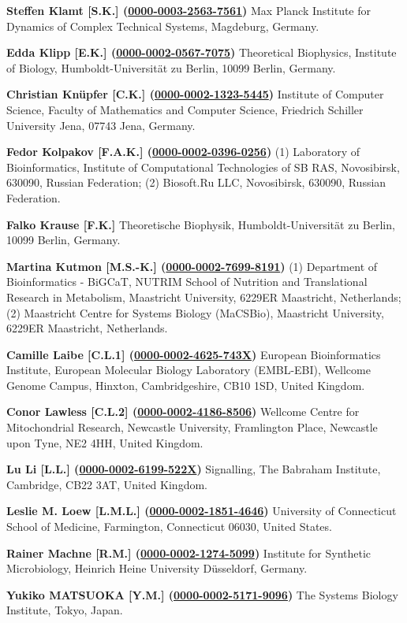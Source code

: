 \documentclass{sbml-paper}
\newcommand{\orcid}[1]{\href{https://orcid.org/#1}{#1}}
\begin{document}
\textbf{Steffen Klamt [S.K.] (\orcid{0000-0003-2563-7561})} Max Planck Institute for Dynamics of Complex Technical Systems, Magdeburg, Germany.

\textbf{Edda Klipp [E.K.] (\orcid{0000-0002-0567-7075})} Theoretical Biophysics, Institute of Biology, Humboldt-Universität zu Berlin, 10099 Berlin, Germany.

\textbf{Christian Knüpfer [C.K.] (\orcid{0000-0002-1323-5445})} Institute of Computer Science, Faculty of Mathematics and Computer Science, Friedrich Schiller University Jena, 07743 Jena, Germany.

\textbf{Fedor Kolpakov [F.A.K.] (\orcid{0000-0002-0396-0256})} (1) Laboratory of Bioinformatics, Institute of Computational Technologies of SB RAS, Novosibirsk, 630090, Russian Federation; (2) Biosoft.Ru LLC, Novosibirsk, 630090, Russian Federation.

\textbf{Falko Krause [F.K.]} Theoretische Biophysik, Humboldt-Universität zu Berlin, 10099 Berlin, Germany.

\textbf{Martina Kutmon [M.S.-K.] (\orcid{0000-0002-7699-8191})} (1) Department of Bioinformatics - BiGCaT, NUTRIM School of Nutrition and Translational Research in Metabolism, Maastricht University, 6229ER Maastricht, Netherlands; (2) Maastricht Centre for Systems Biology (MaCSBio), Maastricht University, 6229ER Maastricht, Netherlands.

\textbf{Camille Laibe [C.L.1] (\orcid{0000-0002-4625-743X})} European Bioinformatics Institute, European Molecular Biology Laboratory (EMBL-EBI), Wellcome Genome Campus, Hinxton, Cambridgeshire, CB10 1SD, United Kingdom.

\textbf{Conor Lawless [C.L.2] (\orcid{0000-0002-4186-8506})} Wellcome Centre for Mitochondrial Research, Newcastle University, Framlington Place, Newcastle upon Tyne, NE2 4HH, United Kingdom.

\textbf{Lu Li [L.L.] (\orcid{0000-0002-6199-522X})} Signalling, The Babraham Institute, Cambridge, CB22 3AT, United Kingdom.

\textbf{Leslie M. Loew [L.M.L.] (\orcid{0000-0002-1851-4646})} University of Connecticut School of Medicine, Farmington, Connecticut 06030, United States.

\textbf{Rainer Machne [R.M.] (\orcid{0000-0002-1274-5099})} Institute for Synthetic Microbiology, Heinrich Heine University Düsseldorf, Germany.

\textbf{Yukiko MATSUOKA [Y.M.] (\orcid{0000-0002-5171-9096})} The Systems Biology Institute, Tokyo, Japan.
\end{document}
